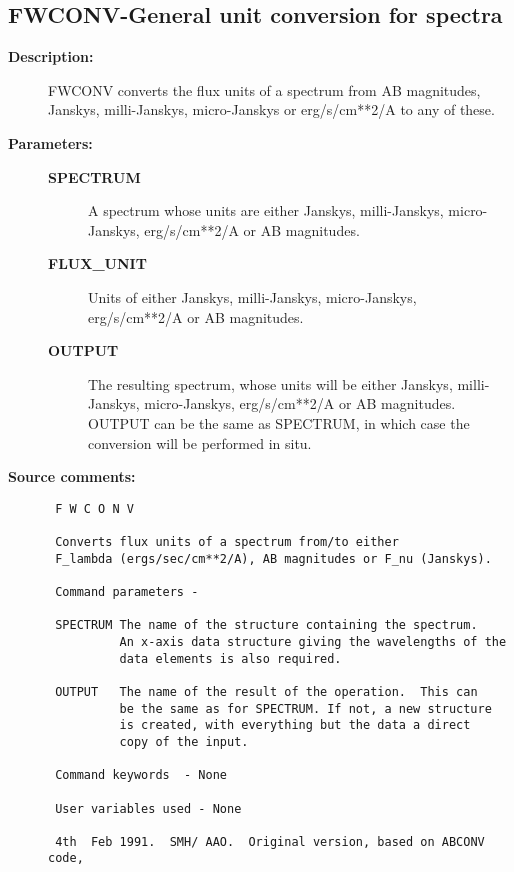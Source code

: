\subsection{FWCONV-\label{FWCONV}General unit conversion for spectra}
\begin{description}

\item [{\bf Description:}]
 FWCONV converts the flux units of a spectrum from AB magnitudes,
 Janskys, milli-Janskys, micro-Janskys or erg/s/cm**2/A to any of
 these.

\item [{\bf Parameters:}]
\begin{description}
\item [{\bf SPECTRUM}]
 A spectrum whose units are either Janskys,
 milli-Janskys, micro-Janskys, erg/s/cm**2/A
 or AB magnitudes.
\item [{\bf FLUX_UNIT}]
 Units of either Janskys, milli-Janskys,
 micro-Janskys, erg/s/cm**2/A or AB magnitudes.
\item [{\bf OUTPUT}]
 The resulting spectrum, whose units will be either
 Janskys, milli-Janskys, micro-Janskys, erg/s/cm**2/A or
 AB magnitudes.  OUTPUT can be the same as SPECTRUM, in which
 case the conversion will be performed in situ.
\end{description}

\item [{\bf Source comments:}]
\begin{verbatim}
 F W C O N V

 Converts flux units of a spectrum from/to either
 F_lambda (ergs/sec/cm**2/A), AB magnitudes or F_nu (Janskys).

 Command parameters -

 SPECTRUM The name of the structure containing the spectrum.
          An x-axis data structure giving the wavelengths of the
          data elements is also required.

 OUTPUT   The name of the result of the operation.  This can
          be the same as for SPECTRUM. If not, a new structure
          is created, with everything but the data a direct
          copy of the input.

 Command keywords  - None

 User variables used - None

 4th  Feb 1991.  SMH/ AAO.  Original version, based on ABCONV code,
\end{verbatim}
\end{description}

